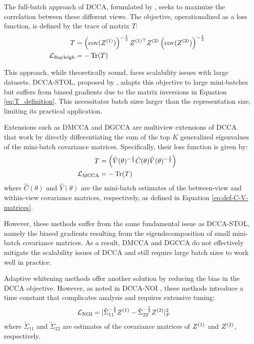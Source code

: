 The full-batch approach of DCCA, formulated by \citet{andrew2013deep}, seeks to maximize the correlation between these different views.
The objective, operationalized as a loss function, is defined by the trace of matrix $T$:
\begin{align}\label{eq:T_definition}
T &= \left(\text{cov}(Z^{(1)})\right)^{-\frac{1}{2}} Z^{(1)\top} Z^{(2)} \left(\text{cov}(Z^{(2)})\right)^{-\frac{1}{2}} \\
\mathcal{L}_\text{Rayleigh} &= -\operatorname{Tr}(T)
\end{align}

This approach, while theoretically sound, faces scalability issues with large datasets.
DCCA-STOL, proposed by \citet{wang2015unsupervised}, adapts this objective to large mini-batches but suffers from biased gradients due to the matrix inversions in Equation \eqref{eq:T_definition}.
This necessitates batch sizes larger than the representation size, limiting its practical application.

Extensions such as DMCCA \citep{somandepalli2019multimodal} and DGCCA \citep{benton2017deep} are multiview extensions of DCCA that work by directly differentiating the sum of the top $K$ generalized eigenvalues of the mini-batch covariance matrices. Specifically, their loss function is given by:
\begin{align}
    T &= \left(\hat{V}(\theta)^{-\frac{1}{2}} \hat{C}(\theta)\hat{V}(\theta)^{-\frac{1}{2}}\right)\\
    \mathcal{L}_\text{MCCA} &= -\operatorname{Tr}(T)
\end{align}
    where $\hat{C}(\theta)$ and $\hat{V}(\theta)$ are the mini-batch estimates of the between-view and within-view covariance matrices, respectively, as defined in Equation \eqref{eq:def-C-V-matrices}.

However, these methods suffer from the same fundamental issue as DCCA-STOL, namely the biased gradients resulting from the eigendecomposition of small mini-batch covariance matrices. As a result, DMCCA and DGCCA do not effectively mitigate the scalability issues of DCCA and still require large batch sizes to work well in practice.

Adaptive whitening methods \citep{wang2015stochastic, chang2018scalable} offer another solution by reducing the bias in the DCCA objective.
However, as noted in DCCA-NOI \citep{wang2015unsupervised}, these methods introduce a time constant that complicates analysis and requires extensive tuning:
\begin{align}
\mathcal{L}_\text{NOI} &= |{\tilde{\Sigma}_{11}}^{-\frac{1}{2}} Z^{(1)}-{\tilde{\Sigma}_{22}}^{-\frac{1}{2}} Z^{(2)}|^2_F
\end{align}
where $\tilde{\Sigma}_{11}$ and $\tilde{\Sigma}_{22}$ are estimates of the covariance matrices of $Z^{(1)}$ and $Z^{(2)}$, respectively.

